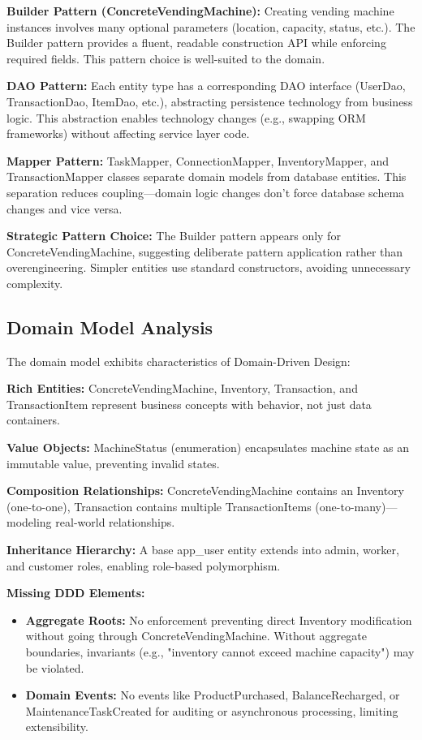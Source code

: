\documentclass[11pt,a4paper]{article}
\begin{document}
\begin{tcolorbox}[colback=strengthgreen!5,colframe=strengthgreen,title=\textbf{Patterns Applied Effectively}]
\textbf{Builder Pattern (ConcreteVendingMachine):} Creating vending machine instances involves many optional parameters (location, capacity, status, etc.). The Builder pattern provides a fluent, readable construction API while enforcing required fields. This pattern choice is well-suited to the domain.

\textbf{DAO Pattern:} Each entity type has a corresponding DAO interface (UserDao, TransactionDao, ItemDao, etc.), abstracting persistence technology from business logic. This abstraction enables technology changes (e.g., swapping ORM frameworks) without affecting service layer code.

\textbf{Mapper Pattern:} TaskMapper, ConnectionMapper, InventoryMapper, and TransactionMapper classes separate domain models from database entities. This separation reduces coupling—domain logic changes don't force database schema changes and vice versa.
\end{tcolorbox}

\textbf{Strategic Pattern Choice:} The Builder pattern appears only for ConcreteVendingMachine, suggesting deliberate pattern application rather than overengineering. Simpler entities use standard constructors, avoiding unnecessary complexity.

\subsection{Domain Model Analysis}

The domain model exhibits characteristics of Domain-Driven Design:

\textbf{Rich Entities:} ConcreteVendingMachine, Inventory, Transaction, and TransactionItem represent business concepts with behavior, not just data containers.

\textbf{Value Objects:} MachineStatus (enumeration) encapsulates machine state as an immutable value, preventing invalid states.

\textbf{Composition Relationships:} ConcreteVendingMachine contains an Inventory (one-to-one), Transaction contains multiple TransactionItems (one-to-many)—modeling real-world relationships.

\textbf{Inheritance Hierarchy:} A base app\_user entity extends into admin, worker, and customer roles, enabling role-based polymorphism.

\textbf{Missing DDD Elements:}
\begin{itemize}
    \item \textbf{Aggregate Roots:} No enforcement preventing direct Inventory modification without going through ConcreteVendingMachine. Without aggregate boundaries, invariants (e.g., "inventory cannot exceed machine capacity") may be violated.

    \item \textbf{Domain Events:} No events like ProductPurchased, BalanceRecharged, or MaintenanceTaskCreated for auditing or asynchronous processing, limiting extensibility.
\end{itemize}
\end{document}
